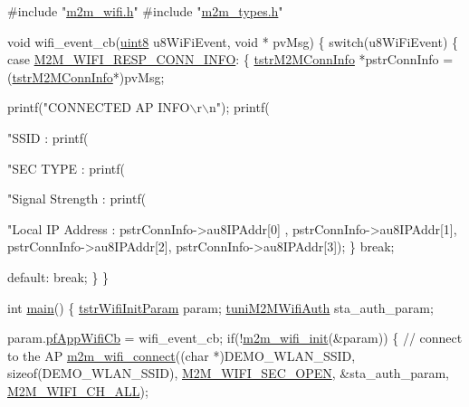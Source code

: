 \begin{DoxyCode}
\textcolor{preprocessor}{#include "\hyperlink{m2m__wifi_8h}{m2m\_wifi.h}"}
\textcolor{preprocessor}{#include "\hyperlink{m2m__types_8h}{m2m\_types.h}"}


\textcolor{keywordtype}{void} wifi\_event\_cb(\hyperlink{group__DataT_ga4df709a77647e870bbf1d955b8edc9a6}{uint8} u8WiFiEvent, \textcolor{keywordtype}{void} * pvMsg)
\{
    \textcolor{keywordflow}{switch}(u8WiFiEvent)
    \{
    \textcolor{keywordflow}{case} \hyperlink{group__WlanEnums_gga064de09dec1d5e88ed8d075fa40f57dea35767ad0217ab92b149bc77e79610d33}{M2M\_WIFI\_RESP\_CONN\_INFO}:
        \{
            \hyperlink{structtstrM2MConnInfo}{tstrM2MConnInfo}     *pstrConnInfo = (\hyperlink{structtstrM2MConnInfo}{tstrM2MConnInfo}*)pvMsg;
            
            printf(\textcolor{stringliteral}{"CONNECTED AP INFO\(\backslash\)r\(\backslash\)n"});
            printf(\textcolor{stringliteral}{"SSID                : %
            printf(\textcolor{stringliteral}{"SEC TYPE            : %
            printf(\textcolor{stringliteral}{"Signal Strength     : %
            printf(\textcolor{stringliteral}{"Local IP Address    : %
                pstrConnInfo->au8IPAddr[0] , pstrConnInfo->au8IPAddr[1], pstrConnInfo->au8IPAddr[2], 
      pstrConnInfo->au8IPAddr[3]);
        \}
        \textcolor{keywordflow}{break};

    \textcolor{keywordflow}{default}:
        \textcolor{keywordflow}{break};
    \}
\}

\textcolor{keywordtype}{int} \hyperlink{demo_2microchip_2pic32mz__ef__curiosity_2wifi__http__server__demo_2src_2main_8c_ac5a1eca594b063e0d2dbccf86f96f221}{main}()
\{
    \hyperlink{structtstrWifiInitParam}{tstrWifiInitParam}   param;
    \hyperlink{uniontuniM2MWifiAuth}{tuniM2MWifiAuth}   sta\_auth\_param;
    
    param.\hyperlink{group__WifiSetCustInfoElementFn_ga13d5fa7a0c71fd59bbf36a61923835cc}{pfAppWifiCb}   = wifi\_event\_cb;
    \textcolor{keywordflow}{if}(!\hyperlink{group__WifiInitFn_ga73c734812e844d96d860c4e93e9daf35}{m2m\_wifi\_init}(&param))
    \{
        \textcolor{comment}{// connect to the AP}
        \hyperlink{group__WifiConnectFn_ga19c9871147efe70f5d9c2cc2cdd5bff0}{m2m\_wifi\_connect}((\textcolor{keywordtype}{char} *)DEMO\_WLAN\_SSID, \textcolor{keyword}{sizeof}(DEMO\_WLAN\_SSID),
            \hyperlink{group__WlanEnums_ggaa232a09c953ec8200c13774f94107b05a81b513753be791c13b73d0b2d3639b69}{M2M\_WIFI\_SEC\_OPEN}, &sta\_auth\_param, \hyperlink{group__WlanEnums_gga2a91dd671e2672dba1a7ed45230f3a99a9ab262cc4f83b59a0710ffb80134c637}{M2M\_WIFI\_CH\_ALL});

}}}}
\end{DoxyCode}
